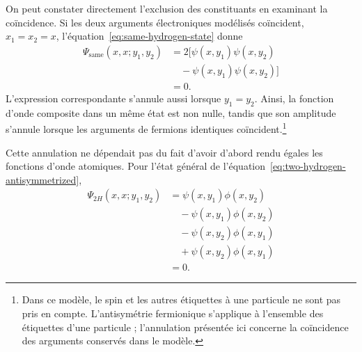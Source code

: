 On peut constater directement l’exclusion des constituants en examinant la coïncidence. Si les deux arguments électroniques modélisés coïncident, \(x_1=x_2=x\), l’équation~\eqref{eq:same-hydrogen-state} donne
\begin{align}
\Psi_{\mathrm{same}}(x,x;y_1,y_2)
&=2\bigl[
\psi(x,y_1)\psi(x,y_2)\nonumber\\
&\quad{}-\psi(x,y_1)\psi(x,y_2)
\bigr]\\
&=0.
\end{align}
L’expression correspondante s’annule aussi lorsque \(y_1=y_2\). Ainsi, la fonction d’onde composite dans un même état est non nulle, tandis que son amplitude s’annule lorsque les arguments de fermions identiques coïncident.\footnote{Dans ce modèle, le spin et les autres étiquettes à une particule ne sont pas pris en compte. L’antisymétrie fermionique s’applique à l’ensemble des étiquettes d’une particule ; l’annulation présentée ici concerne la coïncidence des arguments conservés dans le modèle.}

\begin{classroomqa}\end{classroomqa}

\begin{classroomqa}\end{classroomqa}

Cette annulation ne dépendait pas du fait d’avoir d’abord rendu égales les fonctions d’onde atomiques. Pour l’état général de l’équation~\eqref{eq:two-hydrogen-antisymmetrized},
\begin{align}
\Psi_{2H}(x,x;y_1,y_2)
&=\psi(x,y_1)\phi(x,y_2)\nonumber\\
&\quad{}-\psi(x,y_1)\phi(x,y_2)\nonumber\\
&\quad{}-\psi(x,y_2)\phi(x,y_1)\nonumber\\
&\quad{}+\psi(x,y_2)\phi(x,y_1)\\
&=0.
\end{align}

